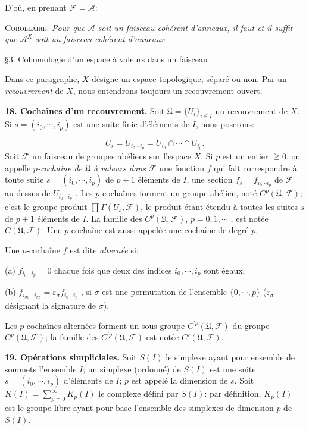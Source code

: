 D'où, en prenant $\mathcal{F} = \mathcal{A}$:

\textsc{Corollaire}. \textit{Pour que $\mathcal{A}$ soit un faisceau cohérent d'anneaux, il faut et il suffit que $\mathcal{A}^X$ soit un faisceau cohérent d'anneaux.}


\S3. Cohomologie d'un espace à valeurs dans un faisceau

Dans ce paragraphe, $X$ désigne un espace topologique, séparé ou non. Par un \textit{recouvrement} de $X$, nous entendrons toujours un recouvrement ouvert.

\textbf{18. Cochaînes d'un recouvrement.} Soit $\mathfrak{U} = \{U_i\}_{i \in I}$ un recouvrement de $X$. Si $s = (i_0 , \cdots , i_p)$ est une suite finie d'éléments de $I$, nous poserons:

\begin{equation*}
U_s = U_{i_0 \cdots i_p} = U_{i_0} \cap \cdots \cap U_{i_p} .
\end{equation*}
Soit $\mathcal{F}$ un faisceau de groupes abéliens sur l'espace $X$. Si $p$ est un entier $\geqq 0$, on appelle \textit{$p$-cochaîne de $\mathfrak{U}$ à valeurs dans $\mathcal{F}$} une fonction $f$ qui fait correspondre à toute suite $s = (i_0 , \cdots , i_p)$ de $p + 1$ éléments de $I$, une section $f_s = f_{i_0 \cdots i_p}$ de $\mathcal{F}$ au-dessus de $U_{i_0 \cdots i_p}$ . Les $p$-cochaînes forment un groupe abélien, noté $C^p(\mathfrak{U}, \mathcal{F})$; c'est le groupe produit $\prod \Gamma(U_s , \mathcal{F})$, le produit étant étendu à toutes les suites $s$ de $p + 1$ éléments de $I$. La famille des $C^p(\mathfrak{U}, \mathcal{F})$, $p = 0, 1, \cdots$ , est notée $C(\mathfrak{U}, \mathcal{F})$. Une $p$-cochaîne est aussi appelée une cochaîne de degré $p$.

Une $p$-cochaîne $f$ est dite \textit{alternée} si:

(a) $f_{i_0 \cdots i_p} = 0$ chaque fois que deux des indices $i_0 , \cdots , i_p$ sont égaux,

(b) $f_{i_{\sigma 0} \cdots i_{\sigma p}} = \varepsilon_\sigma f_{i_0 \cdots i_p}$ , si $\sigma$ est une permutation de l'ensemble $\{0, \cdots , p\}$ ($\varepsilon_\sigma$ désignant la signature de $\sigma$).

Les $p$-cochaînes alternées forment un sous-groupe $C^{\prime p}(\mathfrak{U}, \mathcal{F})$ du groupe $C^p(\mathfrak{U}, \mathcal{F})$; la famille des $C^{\prime p}(\mathfrak{U}, \mathcal{F})$ est notée $C'(\mathfrak{U}, \mathcal{F})$.

\textbf{19. Opérations simpliciales.} Soit $S(I)$ le simplexe ayant pour ensemble de sommets l'ensemble $I$; un simplexe (ordonné) de $S(I)$ est une suite $s = (i_0 , \cdots , i_p)$ d'éléments de $I$; $p$ est appelé la dimension de $s$. Soit $K(I) = \sum_{p=0}^{\infty} K_p(I)$ le complexe défini par $S(I)$: par définition, $K_p(I)$ est le groupe libre ayant pour base l'ensemble des simplexes de dimension $p$ de $S(I)$.

